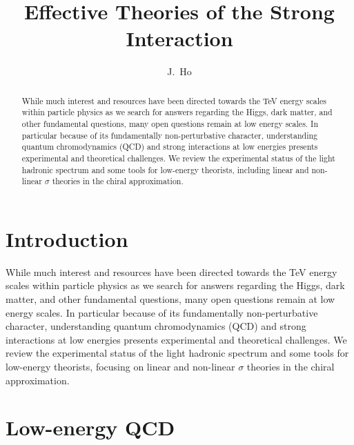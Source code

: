 \documentclass[aps,prd,onecolumn,showpacs,amsmath,amssymb,nofootinbib]{revtex4} \pdfoutput=1
\begin{document}
\title{Effective Theories of the Strong Interaction}

\author{J.~Ho}

\begin{abstract}
While much interest and resources have been directed towards the TeV energy scales within particle physics as we search for answers regarding the Higgs, dark matter, and other fundamental questions, many open questions remain at low energy scales. In particular because of its fundamentally non-perturbative character, understanding quantum chromodynamics (QCD) and strong interactions at low energies presents experimental and theoretical challenges. We review the experimental status of the light hadronic spectrum and some tools for low-energy theorists, including linear and non-linear $\sigma$ theories in the chiral approximation.
\end{abstract}
\maketitle
\section{Introduction}\label{I}
While much interest and resources have been directed towards the TeV energy scales within particle physics as we search for answers regarding the Higgs, dark matter, and other fundamental questions, many open questions remain at low energy scales. In particular because of its fundamentally non-perturbative character, understanding quantum chromodynamics (QCD) and strong interactions at low energies presents experimental and theoretical challenges. We review the experimental status of the light hadronic spectrum and some tools for low-energy theorists, focusing on linear and non-linear $\sigma$ theories in the chiral approximation.


\section{Low-energy QCD}\label{II}
\end{document}
